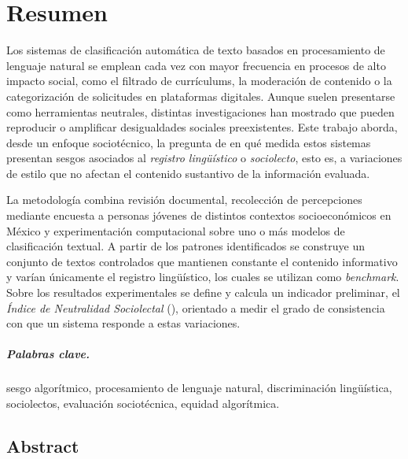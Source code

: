 
\chapter*{Resumen}

Los sistemas de clasificación automática de texto basados en procesamiento de
lenguaje natural se emplean cada vez con mayor frecuencia en procesos de alto
impacto social, como el filtrado de currículums, la moderación de contenido o
la categorización de solicitudes en plataformas digitales. Aunque suelen
presentarse como herramientas neutrales, distintas investigaciones han mostrado
que pueden reproducir o amplificar desigualdades sociales preexistentes. Este
trabajo aborda, desde un enfoque sociotécnico, la pregunta de en qué medida
estos sistemas presentan sesgos asociados al \emph{registro lingüístico} o
\emph{sociolecto}, esto es, a variaciones de estilo que no afectan el contenido
sustantivo de la información evaluada.

La metodología combina revisión documental, recolección de percepciones
mediante encuesta a personas jóvenes de distintos contextos socioeconómicos en
México y experimentación computacional sobre uno o más modelos de clasificación
textual. A partir de los patrones identificados se construye un conjunto de
textos controlados que mantienen constante el contenido informativo y varían
únicamente el registro lingüístico, los cuales se utilizan como
\emph{benchmark}. Sobre los resultados experimentales se define y calcula un
indicador preliminar, el \emph{Índice de Neutralidad Sociolectal} (\INS),
orientado a medir el grado de consistencia con que un sistema responde a estas
variaciones.

\paragraph{Palabras clave.} sesgo algorítmico, procesamiento de lenguaje
natural, discriminación lingüística, sociolectos, evaluación sociotécnica,
equidad algorítmica.

\vspace{1.5cm}

\section*{Abstract}

